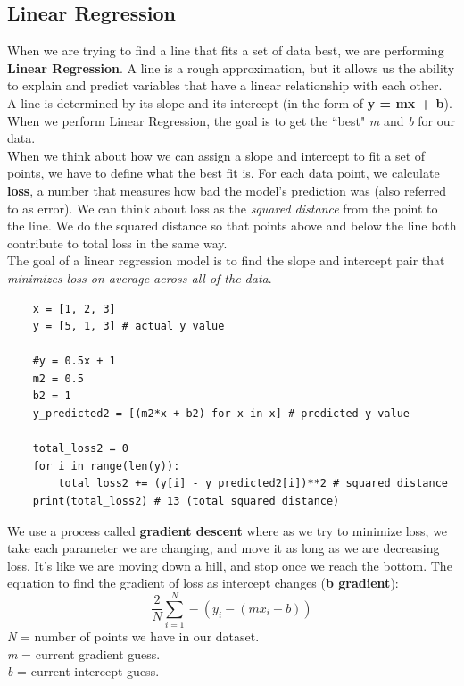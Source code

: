 \documentclass[11pt, a4paper]{article}
\begin{document}
\begin{spacing}{1.1}
	\subsection{Linear Regression}
	When we are trying to find a line that fits a set of data best, we are performing \textbf{Linear Regression}. A line is a rough approximation, but it allows us the ability to explain and predict variables that have a linear relationship with each other. \vspace*{2mm} \\	
	A line is determined by its slope and its intercept (in the form of \textbf{y = mx + b}). When we perform Linear Regression, the goal is to get the ``best" \textit{m} and \textit{b} for our data. \vspace*{2mm} \\
	When we think about how we can assign a slope and intercept to fit a set of points, we have to define what the best fit is. For each data point, we calculate \textbf{loss}, a number that measures how bad the model’s prediction was (also referred to as error). We can think about loss as the \textit{squared distance} from the point to the line. We do the squared distance so that points above and below the line both contribute to total loss in the same way. \vspace*{2mm} \\
	The goal of a linear regression model is to find the slope and intercept pair that \textit{minimizes loss on average across all of the data}.
	\begin{lstlisting}
	x = [1, 2, 3]
	y = [5, 1, 3] # actual y value
	
	#y = 0.5x + 1
	m2 = 0.5
	b2 = 1
	y_predicted2 = [(m2*x + b2) for x in x] # predicted y value
	
	total_loss2 = 0
	for i in range(len(y)):
		total_loss2 += (y[i] - y_predicted2[i])**2 # squared distance
	print(total_loss2) # 13 (total squared distance) \end{lstlisting}\vspace*{1mm}
	We use a process called \textbf{gradient descent} where as we try to minimize loss, we take each parameter we are changing, and move it as long as we are decreasing loss. It’s like we are moving down a hill, and stop once we reach the bottom. The equation to find the gradient of loss as intercept changes (\textbf{b gradient}): $$ \frac{2}{N} \sum_{i=1}^{N} -(y_i - (mx_i + b)) $$ \textit{N} = number of points we have in our dataset. \\ \textit{m} = current gradient guess. \\ \textit{b} = current intercept guess. \newpage


\end{spacing}
\end{document}
